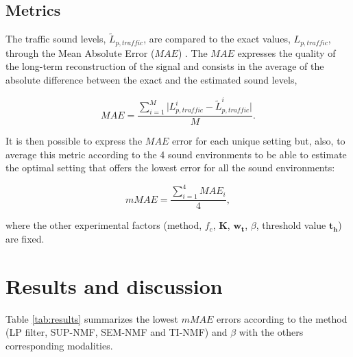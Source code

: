 \documentclass[review,5p,twocolumn,sort&compress,times]{elsarticle}
\begin{document}
\subsection{Metrics}

The traffic sound levels, $\tilde{L}_{p,traffic}$, are compared to the exact values, $L_{p,traffic}$, through the Mean Absolute Error ($MAE$) \cite{willmott2005advantages}. The $MAE$ expresses the quality of the long-term reconstruction of the signal and consists in the average of the absolute difference between the exact and the estimated sound levels,

\begin{equation}
MAE = \frac{\sum_{i = 1}^{M} \vert L_{p,traffic}^i - \tilde{L}_{p,traffic}^i \vert}{M}.
\end{equation}

It is then possible to express the $MAE$ error for each unique setting but, also, to average this metric according to the 4 sound environments to be able to estimate the optimal setting that offers the lowest error for all the sound environments:

\begin{equation}
mMAE = \frac{\sum_{i = 1}^4 MAE_i}{4},
\end{equation}

where the other experimental factors (method, $f_c$, $\mathbf{K}$, $\mathbf{w_t}$, $\beta$, threshold value $\mathbf{t_h}$) are fixed.


\section{Results and discussion}\label{part:results}

Table \ref{tab:results} summarizes the lowest $mMAE$ errors according to the method (LP filter, SUP-NMF, SEM-NMF and TI-NMF) and $\beta$ with the others corresponding modalities.
\end{document}
